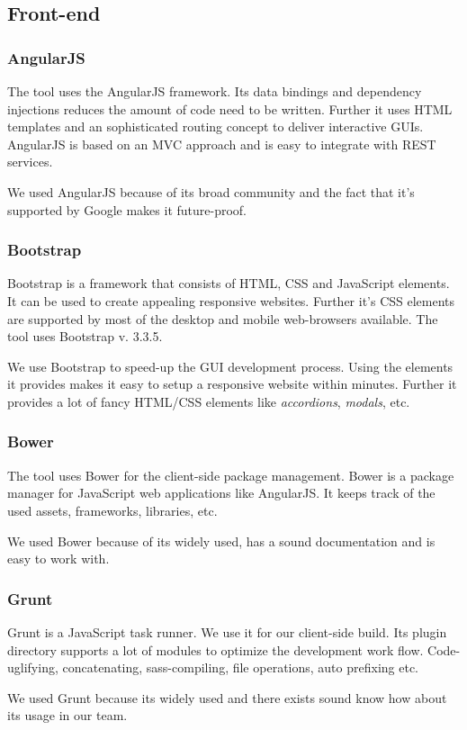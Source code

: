 \subsection{Front-end}

\subsubsection{AngularJS}
The tool uses the AngularJS framework. Its data bindings and dependency injections reduces the amount of code need to be written. Further it uses HTML templates and an sophisticated routing concept to deliver interactive GUIs. AngularJS is based on an MVC approach and is easy to integrate with REST services.\cite{angular}\par
We used AngularJS because of its broad community and the fact that it's supported by Google makes it future-proof.

\subsubsection{Bootstrap}
Bootstrap is a framework that consists of HTML, CSS and JavaScript elements. It can be used to create appealing responsive websites. Further it's CSS elements are supported by most of the desktop and mobile web-browsers available. The tool uses Bootstrap v. 3.3.5. \cite{bootstrap}\par
We use Bootstrap to speed-up the GUI development process. Using the elements it provides makes it easy to setup a responsive website within minutes. Further it provides a lot of fancy HTML/CSS elements like \textit{accordions}, \textit{modals}, etc.

\subsubsection{Bower}
The tool uses Bower for the client-side package management. Bower is a package manager for JavaScript web applications like AngularJS. It keeps track of the used assets, frameworks, libraries, etc. \cite{bower} \par
We used Bower because of its widely used, has a sound documentation and is easy to work with.

\subsubsection{Grunt}
Grunt is a JavaScript task runner. We use it for our client-side build. Its plugin directory supports a lot of modules to optimize the development work flow. Code-uglifying, concatenating, sass-compiling, file operations, auto prefixing etc. \cite{grunt} \par
We used Grunt because its widely used and there exists sound know how about its usage in our team.


